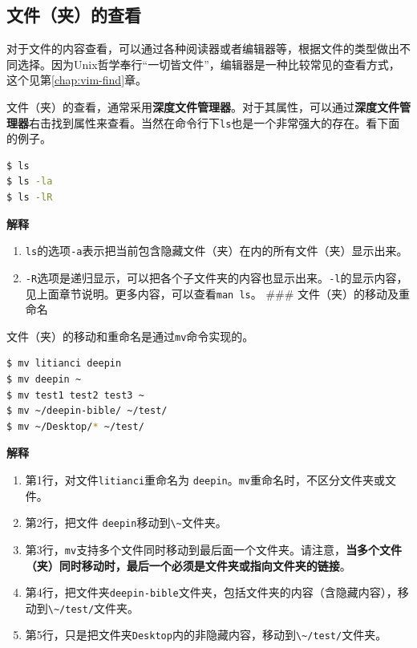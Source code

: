 \documentclass[doctor,openright,twoside]{sjtuthesis}
\providecommand{\tightlist}{%
    \setlength{\itemsep}{0pt}\setlength{\parskip}{0pt}}
\newcommand{\passthrough}[1]{#1}
\theoremstyle{plain}
\theoremstyle{definition}
\theoremstyle{remark}
\theoremstyle{ocrenumbox}
\theoremstyle{plain}
\newcommand\cqh{“}
\newcommand\cqt{”}
\begin{document}
\subsection{文件（夹）的查看}

对于文件的内容查看，可以通过各种阅读器或者编辑器等，根据文件的类型做出不同选择。因为Unix哲学奉行\cqh 一切皆文件\cqt ，编辑器是一种比较常见的查看方式，这个见第\ref{chap:vim-find}章。

文件（夹）的查看，通常采用\textbf{深度文件管理器}。对于其属性，可以通过\textbf{深度文件管理器}右击找到属性来查看。当然在命令行下\passthrough{\lstinline!ls!}也是一个非常强大的存在。看下面的例子。

\begin{lstlisting}[language=bash]
$ ls
$ ls -la
$ ls -lR
\end{lstlisting}

\textbf{解释}

\begin{enumerate}
\def\labelenumi{\arabic{enumi}.}
\tightlist
\item
  \passthrough{\lstinline!ls!}的选项\passthrough{\lstinline!-a!}表示把当前包含隐藏文件（夹）在内的所有文件（夹）显示出来。
\item
  \passthrough{\lstinline!-R!}选项是递归显示，可以把各个子文件夹的内容也显示出来。\passthrough{\lstinline!-l!}的显示内容，见上面章节说明。更多内容，可以查看\passthrough{\lstinline!man ls!}。
  \#\#\# 文件（夹）的移动及重命名
\end{enumerate}

文件（夹）的移动和重命名是通过\passthrough{\lstinline!mv!}命令实现的。

\begin{lstlisting}[language=bash]
$ mv litianci deepin
$ mv deepin ~
$ mv test1 test2 test3 ~
$ mv ~/deepin-bible/ ~/test/
$ mv ~/Desktop/* ~/test/
\end{lstlisting}

\textbf{解释}

\begin{enumerate}
\def\labelenumi{\arabic{enumi}.}
\tightlist
\item
  第1行，对文件\passthrough{\lstinline!litianci!}重命名为
  \passthrough{\lstinline!deepin!}。\passthrough{\lstinline!mv!}重命名时，不区分文件夹或文件。
\item
  第2行，把文件
  \passthrough{\lstinline!deepin!}移动到\passthrough{\lstinline!\~!}文件夹。
\item
  第3行，\passthrough{\lstinline!mv!}支持多个文件同时移动到最后面一个文件夹。请注意，\textbf{当多个文件（夹）同时移动时，最后一个必须是文件夹或指向文件夹的链接}。
\item
  第4行，把文件夹\passthrough{\lstinline!deepin-bible!}文件夹，包括文件夹的内容（含隐藏内容），移动到\passthrough{\lstinline!\~/test/!}文件夹。
\item
  第5行，只是把文件夹\passthrough{\lstinline!Desktop!}内的非隐藏内容，移动到\passthrough{\lstinline!\~/test/!}文件夹。
\end{enumerate}
\end{document}
